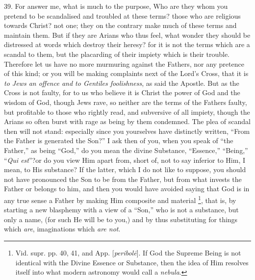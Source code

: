 39. For answer me, what is
much to the purpose, Who are they whom you pretend to be scandalised
and troubled at these terms? those who are religious towards Christ?
not one; they on the contrary make much of these terms and maintain
them. But if they are Arians who thus feel, what wonder they should be
distressed at words which destroy their heresy? for it is not the
terms which are a scandal to them, but the placarding of their impiety
which is their trouble. Therefore let us have no more murmuring
against the Fathers, nor any pretence of this kind; or you will be
making complaints next of the Lord's Cross, that it is \emph{to Jews an
offence and to Gentiles foolishness}, as said the Apostle. But as
the Cross is not faulty, for to us who believe it is Christ the power
of God and the wisdom of God, though Jews rave, so neither are the
terms of the Fathers faulty, but profitable to those who rightly read,
and subversive of all impiety, though the Arians so often burst with rage as being by them condemned. The plea of scandal then will
not stand: especially since you yourselves have distinctly written, ``From
the Father is generated the Son?'' I ask then of you, when you speak of
``the Father,'' as being ``God,'' do you mean the divine Substance, ``Essence,''
``Being,'' ``\emph{Qui est}''?\emph{}or do you view Him apart from, short
of, not to say inferior to Him, I mean, to His substance? If the
latter, which I do not like to suppose, you should not have pronounced
the Son to be from the Father, but from what invests the Father or
belongs to him, and then you would have avoided saying that God is in
any true sense a Father by making Him composite and material \footnote{Vid. supr. pp. 40, 41, and App. [\emph{peribol\={e}}]. If God the
Supreme Being is not identical with the Divine Essence or Substance,
then the idea of Him resolves itself into what modern astronomy would
call a \emph{nebula}.}, that is, by starting a new blasphemy with a view of a ``Son,''
who is not a substance, but only a name, (for such He will be to you,)
and by thus substituting for things which \emph{are}, imaginations
which \emph{are not}.

